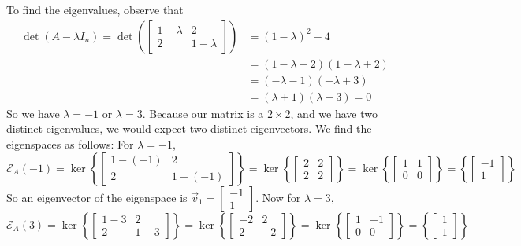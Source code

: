 \documentclass[11pt]{amsart}
\theoremstyle{definition}\newtheorem{definition}{Definition}
\theoremstyle{definition}\newtheorem{notation}{Notation}
\theoremstyle{definition}\newtheorem{example}{Example}
\theoremstyle{theorem}\newtheorem{theorem}{Theorem}
\theoremstyle{theorem}\newtheorem{corollary}{Corollary}
\theoremstyle{theorem}\newtheorem{proposition}{Proposition}
\theoremstyle{theorem}\newtheorem{lemma}{Lemma}
\theoremstyle{theorem}\newtheorem{question}{Question}
\theoremstyle{remark}\newtheorem{remark}{Remark}
\newcommand{\E}{\mathcal{E}}
\begin{document}
To find the eigenvalues, observe that
\begin{align*}
    \det(A - \lambda I_n) = \det\left(\begin{bmatrix}
        1 - \lambda & 2 \\
        2 & 1 - \lambda
    \end{bmatrix}\right) &= (1 - \lambda)^2 - 4 \\
    &= (1 - \lambda - 2)(1 - \lambda + 2) \\
    &= (-\lambda- 1)(-\lambda + 3) \\
    &= (\lambda + 1)(\lambda - 3) = 0
\end{align*}
So we have $\lambda = -1$ or $\lambda = 3$. Because our matrix is a $2 \times 2$, and we have two distinct eigenvalues, we would expect two distinct eigenvectors. We find the eigenspaces as follows: For $\lambda = -1$,
\begin{equation*}
    \E_A(-1) = \ker\left\{\begin{bmatrix} 1 - (-1) & 2 \\ 2 & 1 - (-1) \end{bmatrix}\right\} = \ker\left\{\begin{bmatrix} 2 & 2 \\ 2 & 2 \end{bmatrix}\right\} = \ker\left\{\begin{bmatrix} 1 & 1 \\ 0 & 0 \end{bmatrix}\right\} = \left\{\begin{bmatrix} -1 \\ 1 \end{bmatrix}\right\}
\end{equation*}
So an eigenvector of the eigenspace is $\vec{v}_1 = \begin{bmatrix} -1 \\ 1 \end{bmatrix}$. Now for $\lambda = 3$,
\begin{equation*}
    \E_A(3) = \ker\left\{\begin{bmatrix} 1 - 3 & 2 \\ 2 & 1 - 3 \end{bmatrix}\right\} = \ker\left\{\begin{bmatrix} -2 & 2 \\ 2 & -2 \end{bmatrix}\right\} = \ker\left\{\begin{bmatrix} 1 & -1 \\ 0 & 0 \end{bmatrix}\right\} = \left\{\begin{bmatrix} 1 \\ 1 \end{bmatrix}\right\}
\end{equation*}
\end{document}
